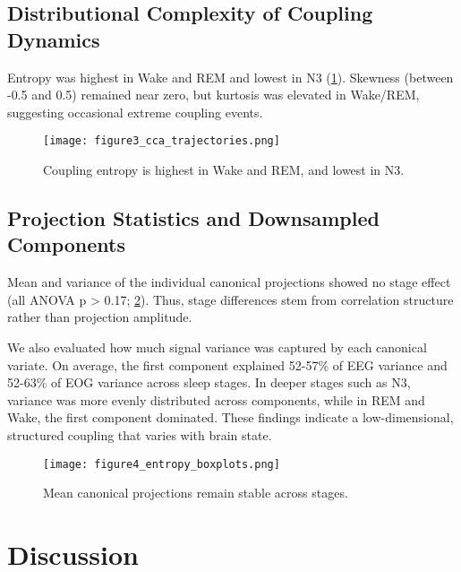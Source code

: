 \subsection{Distributional Complexity of Coupling Dynamics}

Entropy was highest in Wake and REM and lowest in N3 (\ref{fig:figure3}). Skewness (between -0.5 and 0.5) remained near zero, but kurtosis was elevated in Wake/REM, suggesting occasional extreme coupling events.

\begin{figure}
\centering
\texttt{[image: figure3\_cca\_trajectories.png]} %
\caption{Coupling entropy is highest in Wake and REM, and lowest in N3.}\label{fig:figure3}
\end{figure}

\subsection{Projection Statistics and Downsampled Components}

Mean and variance of the individual canonical projections showed no stage effect (all ANOVA p > 0.17; \ref{fig:figure4}). Thus, stage differences stem from correlation structure rather than projection amplitude.

We also evaluated how much signal variance was captured by each canonical variate. On average, the first component explained 52-57\% of EEG variance and 52-63\% of EOG variance across sleep stages. In deeper stages such as N3, variance was more evenly distributed across components, while in REM and Wake, the first component dominated. These findings indicate a low-dimensional, structured coupling that varies with brain state.
\begin{figure}
\centering
\texttt{[image: figure4\_entropy\_boxplots.png]}
\caption{Mean canonical projections remain stable across stages.}\label{fig:figure4}
\end{figure}

\section{Discussion}


